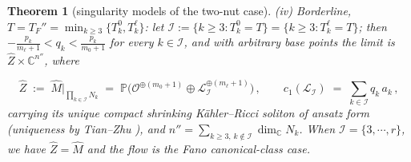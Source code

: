 \documentclass[11pt]{amsart}
\theoremstyle{plain}
\numberwithin{equation}{section}
\newtheorem{theorem}{Theorem}[section]
\theoremstyle{definition}
\theoremstyle{remark}
\begin{document}
\begin{theorem}[singularity models of the two-nut case]
\emph{(iv) Borderline}, $T = T_F'' = \min_{k \geq 3} \{ T_k^0, T_k^\ell \}$: let $\mathcal{I} := \{ k \geq 3 : T_k^0 = T \} = \{ k \geq 3 : T_k^\ell = T \}$; then $- \frac{p_k}{m_\ell + 1} < q_k < \frac{p_k}{m_0 + 1}$ for every $k \in \mathcal{I}$, and with arbitrary base points the limit is $\widehat{Z} \times \mathbb{C}^{n''}$, where

\[
\widehat{Z} \;:=\; \widehat{M} \Big|_{\prod_{k \in \mathcal{I}} N_k} \;=\; \mathbb{P} \big( \mathcal{O}^{\oplus ( m_0 + 1 )} \oplus \mathcal{L}_{\mathcal{I}}^{\oplus ( m_\ell + 1 )} \big) \,, \qquad c_1 ( \mathcal{L}_{\mathcal{I}} ) \;=\; \sum_{k \in \mathcal{I}} q_k\, a_k \,,
\]
carrying its unique compact shrinking K\"ahler--Ricci soliton of ansatz form (uniqueness by Tian--Zhu \cite{TZhu}), and $n'' = \sum_{k \geq 3, \, k \not\in \mathcal{I}} \dim_{\mathbb{C}} N_k$. When $\mathcal{I} = \{ 3, \cdots, r \}$, we have $\widehat{Z} = \widehat{M}$ and the flow is the Fano canonical-class case.

\end{theorem}
\end{document}
